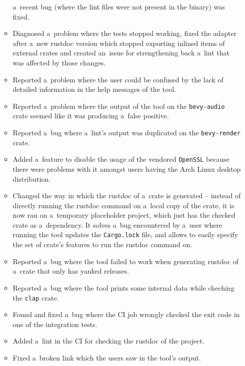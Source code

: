 \documentclass[licencjacka,en]{pracamgr}
\begin{document}
\begin{itemize}
\begin{itemize}
				a~recent bug (where the lint files were not present in the binary) was fixed.
			\item Diagnosed a~problem where the tests stopped working, fixed the adapter after
				a~new rustdoc version which stopped exporting inlined items of external crates
				and created an~issue for strengthening back a~lint that was affected
				by those changes.
			\item Reported a~problem where the user could be confused by the lack of detailed
				information in the help messages of the tool.
			\item Reported a~problem where the output of the tool on the \texttt{bevy-audio} crate
				seemed like it was producing a~false positive.
			\item Reported a~bug where a~lint's output was duplicated on the
				\texttt{bevy-render} crate.
			\item Added a~feature to disable the usage of the vendored \texttt{OpenSSL} because
				there were problems with it amongst users having the Arch Linux desktop distribution.
			\item Changed the way in which the rustdoc of a~crate is generated -- instead of
				directly running the rustdoc command on a~local copy of the crate, it is now ran
				on a~temporary placeholder project, which just has the checked crate as
				a~dependency. It solves a~bug encountered by a~user where running the tool updates
				the \texttt{Cargo.lock} file, and allows to easily specify the set of
				crate's features to run the rustdoc command on.
			\item Reported a~bug where the tool failed to work when generating rustdoc of a~crate
				that only has yanked releases.
			\item Reported a~bug where the tool prints some internal data while cheching
				the \texttt{clap} crate.
			\item Found and fixed a~bug where the CI job wrongly checked the exit code in one
				of the integration tests.
			\item Added a~lint in the CI for checking the rustdoc of the project.
			\item Fixed a~broken link which the users saw in the tool's output.

\end{itemize}
\end{itemize}
\end{document}
